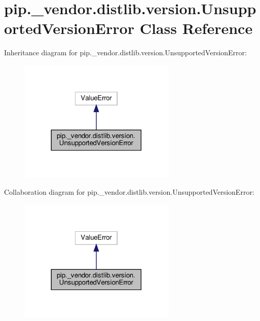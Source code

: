 \hypertarget{classpip_1_1__vendor_1_1distlib_1_1version_1_1UnsupportedVersionError}{}\section{pip.\+\_\+vendor.\+distlib.\+version.\+Unsupported\+Version\+Error Class Reference}
\label{classpip_1_1__vendor_1_1distlib_1_1version_1_1UnsupportedVersionError}


Inheritance diagram for pip.\+\_\+vendor.\+distlib.\+version.\+Unsupported\+Version\+Error\+:
\nopagebreak
\begin{figure}[H]
\begin{center}
\leavevmode
\includegraphics[width=213pt]{classpip_1_1__vendor_1_1distlib_1_1version_1_1UnsupportedVersionError__inherit__graph}
\end{center}
\end{figure}


Collaboration diagram for pip.\+\_\+vendor.\+distlib.\+version.\+Unsupported\+Version\+Error\+:
\nopagebreak
\begin{figure}[H]
\begin{center}
\leavevmode
\includegraphics[width=213pt]{classpip_1_1__vendor_1_1distlib_1_1version_1_1UnsupportedVersionError__coll__graph}
\end{center}
\end{figure}


